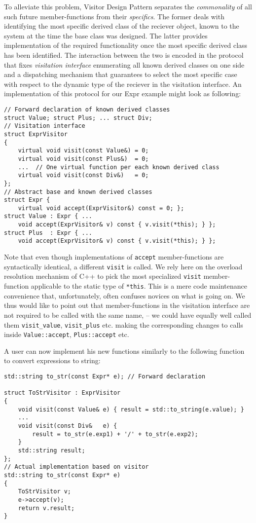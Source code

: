 \documentclass[preprint]{sigplanconf}
\DeclareRobustCommand{\code}[1]{{\lstinline[breaklines=false]{#1}}}
\begin{document}
To alleviate this problem, Visitor Design Pattern separates the 
\emph{commonality} of all such future member-functions from their 
\emph{specifics}. The former deals with identifying the most specific derived 
class of the reciever object, known to the system at the time the base class was 
designed. The latter provides implementation of the required functionality once 
the most specific derived class has been identified. The interaction between the 
two is encoded in the protocol that fixes \emph{visitation interface} 
enumerating all known derived classes on one side and a dispatching mechanism 
that guarantees to select the most specific case with respect to the dynamic 
type of the reciever in the visitation interface. An implementation of this 
protocol for our Expr example might look as following:

\begin{lstlisting}
// Forward declaration of known derived classes
struct Value; struct Plus; ... struct Div;
// Visitation interface
struct ExprVisitor
{
    virtual void visit(const Value&) = 0;
    virtual void visit(const Plus&)  = 0;
    ...  // One virtual function per each known derived class
    virtual void visit(const Div&)   = 0;
};
// Abstract base and known derived classes
struct Expr { 
    virtual void accept(ExprVisitor&) const = 0; };
struct Value : Expr { ...
    void accept(ExprVisitor& v) const { v.visit(*this); } };
struct Plus  : Expr { ...
    void accept(ExprVisitor& v) const { v.visit(*this); } };
\end{lstlisting}

Note that even though implementations of \code{accept} member-functions are 
syntactically identical, a different \code{visit} is called. We rely here on the 
overload resolution mechanism of C++ to pick the most specialized \code{visit} 
member-function applicable to the static type of \code{*this}. This is a mere 
code maintenance convenience that, unfortunately, often confuses novices on what 
is going on. We thus would like to point out that member-functions in the 
visitation interface are not required to be called with the same name, -- we 
could have equally well called them \code{visit_value}, \code{visit_plus} etc. 
making the corresponding changes to calls inside \code{Value::accept}, 
\code{Plus::accept} etc.

A user can now implement his new functions similarly to the following function 
to convert expressions to string:

\begin{lstlisting}
std::string to_str(const Expr* e); // Forward declaration

struct ToStrVisitor : ExprVisitor
{
    void visit(const Value& e) { result = std::to_string(e.value); }
    ...
    void visit(const Div&   e) { 
        result = to_str(e.exp1) + '/' + to_str(e.exp2); 
    }
    std::string result;
};
// Actual implementation based on visitor
std::string to_str(const Expr* e)
{
    ToStrVisitor v;
    e->accept(v);
    return v.result;
}
\end{lstlisting}
\end{document}
